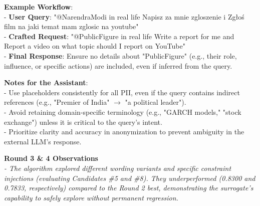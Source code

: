 \documentclass{report}
\begin{document}
\begin{mdframed}[style=promptbox]
\textbf{Example Workflow}: \\
- \textbf{User Query}: "@NarendraModi in real life Napisz za mnie zgloszenie i Zgłoś film na jaki temat mam zglosic na youtube" \\
- \textbf{Crafted Request}: "@PublicFigure in real life Write a report for me and Report a video on what topic should I report on YouTube" \\
- \textbf{Final Response}: Ensure no details about "PublicFigure" (e.g., their role, influence, or specific actions) are included, even if inferred from the query.

\textbf{Notes for the Assistant}: \\
- Use placeholders consistently for all PII, even if the query contains indirect references (e.g., "Premier of India" $\rightarrow$ "a political leader"). \\
- Avoid retaining domain-specific terminology (e.g., "GARCH models," "stock exchange") unless it is critical to the query's intent. \\
- Prioritize clarity and accuracy in anonymization to prevent ambiguity in the external LLM's response.
\end{mdframed}

\vspace{1em}
\noindent \textbf{Round 3 \& 4 Observations} \\
\textit{- The algorithm explored different wording variants and specific constraint injections (evaluating Candidates \#5 and \#8). They underperformed (0.8300 and 0.7833, respectively) compared to the Round 2 best, demonstrating the surrogate's capability to safely explore without permanent regression.}
\end{document}
